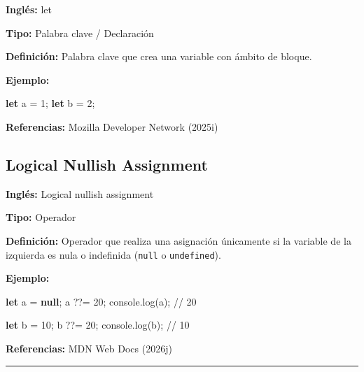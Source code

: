 \documentclass[
  letterpaper,
  DIV=11,
  numbers=noendperiod]{scrreprt}
\newenvironment{Shaded}{\begin{snugshade}}{\end{snugshade}}
\newcommand{\BuiltInTok}[1]{\textcolor[rgb]{0.00,0.23,0.31}{#1}}
\newcommand{\CommentTok}[1]{\textcolor[rgb]{0.37,0.37,0.37}{#1}}
\newcommand{\DecValTok}[1]{\textcolor[rgb]{0.68,0.00,0.00}{#1}}
\newcommand{\FunctionTok}[1]{\textcolor[rgb]{0.28,0.35,0.67}{#1}}
\newcommand{\KeywordTok}[1]{\textcolor[rgb]{0.00,0.23,0.31}{\textbf{#1}}}
\newcommand{\NormalTok}[1]{\textcolor[rgb]{0.00,0.23,0.31}{#1}}
\newcommand{\OperatorTok}[1]{\textcolor[rgb]{0.37,0.37,0.37}{#1}}
\let\oldsubsection\subsection
\renewcommand{\subsection}{\phantomsection\oldsubsection}
\begin{document}
\textbf{Inglés:} let

\textbf{Tipo:} Palabra clave / Declaración

\textbf{Definición:} Palabra clave que crea una variable con ámbito de
bloque.

\textbf{Ejemplo:}

\begin{Shaded}
\begin{Highlighting}[]
\KeywordTok{let}\NormalTok{ a }\OperatorTok{=} \DecValTok{1}\OperatorTok{;}
\KeywordTok{let}\NormalTok{ b }\OperatorTok{=} \DecValTok{2}\OperatorTok{;}
\end{Highlighting}
\end{Shaded}

\textbf{Referencias:} Mozilla Developer Network (2025i)

\subsection*{Logical Nullish
Assignment}\label{glos-logical-nullish-assignment}

\textbf{Inglés:} Logical nullish assignment

\textbf{Tipo:} Operador

\textbf{Definición:} Operador que realiza una asignación únicamente si
la variable de la izquierda es nula o indefinida (\texttt{null} o
\texttt{undefined}).

\textbf{Ejemplo:}

\begin{Shaded}
\begin{Highlighting}[]
\KeywordTok{let}\NormalTok{ a }\OperatorTok{=} \KeywordTok{null}\OperatorTok{;}
\NormalTok{a }\OperatorTok{??=} \DecValTok{20}\OperatorTok{;}
\BuiltInTok{console}\OperatorTok{.}\FunctionTok{log}\NormalTok{(a)}\OperatorTok{;} \CommentTok{// 20}

\KeywordTok{let}\NormalTok{ b }\OperatorTok{=} \DecValTok{10}\OperatorTok{;}
\NormalTok{b }\OperatorTok{??=} \DecValTok{20}\OperatorTok{;}
\BuiltInTok{console}\OperatorTok{.}\FunctionTok{log}\NormalTok{(b)}\OperatorTok{;} \CommentTok{// 10}
\end{Highlighting}
\end{Shaded}

\textbf{Referencias:} MDN Web Docs (2026j)

\begin{center}\rule{0.5\linewidth}{0.5pt}\end{center}
\end{document}
